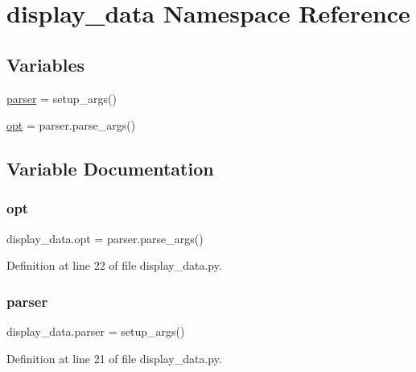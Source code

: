 \hypertarget{namespacedisplay__data}{}\section{display\+\_\+data Namespace Reference}
\label{namespacedisplay__data}
\subsection*{Variables}
\begin{DoxyCompactItemize}
\item 
\hyperlink{namespacedisplay__data_aa3243f42a25038810d228d5d226a038c}{parser} = setup\+\_\+args()
\item 
\hyperlink{namespacedisplay__data_a52acd52b27bb3118944fbb9cf76caaf4}{opt} = parser.\+parse\+\_\+args()
\end{DoxyCompactItemize}


\subsection{Variable Documentation}
\mbox{\label{namespacedisplay__data_a52acd52b27bb3118944fbb9cf76caaf4}} 
\subsubsection{\texorpdfstring{opt}{opt}}
{\footnotesize\ttfamily display\+\_\+data.\+opt = parser.\+parse\+\_\+args()}



Definition at line 22 of file display\+\_\+data.\+py.

\mbox{\label{namespacedisplay__data_aa3243f42a25038810d228d5d226a038c}} 
\subsubsection{\texorpdfstring{parser}{parser}}
{\footnotesize\ttfamily display\+\_\+data.\+parser = setup\+\_\+args()}



Definition at line 21 of file display\+\_\+data.\+py.

